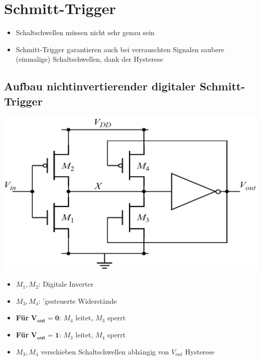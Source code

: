 \section{Schmitt-Trigger}

\begin{itemize}
    \item Schaltschwellen müssen nicht sehr genau sein
    \item Schmitt-Trigger garantieren auch bei verrauschten Signalen saubere (einmalige) Schaltschwellen, dank der Hysterese
\end{itemize}



\subsection{Aufbau nichtinvertierender digitaler Schmitt-Trigger}

\begin{minipage}[position]{0.35\columnwidth}
    \includegraphics[width=\columnwidth]{images/nichtinvertierender_schmitt-trigger.png}
\end{minipage}
\hfill
\begin{minipage}[position]{0.63\columnwidth}
    \begin{itemize}
        \item $M_1, M_2$: Digitale Inverter
        \item $M_3, M_4$: 'gesteuerte Widerstände
        \item \textbf{Für }$\boldsymbol{V_{out} = 0}$: $M_4$ leitet, $M_3$ sperrt
        \item \textbf{Für }$\boldsymbol{V_{out} = 1}$: $M_3$ leitet, $M_4$ sperrt
        \item $M_3, M_4$ verschieben Schaltschwellen abhängig von $V_{out}$ \textrightarrow Hysterese
    \end{itemize}
\end{minipage}



